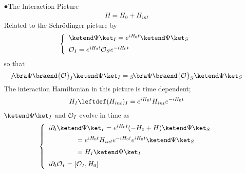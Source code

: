 \bigskip

\noindent
●The Interaction Picture
\begin{eqnarray}
H = H_0 + H_{int}
\label{eqn:HamiltonianDecomposed}
\end{eqnarray}
Related to the Schr\"odinger picture by
\begin{eqnarray}
\left\{
\begin{array}{l}
\ketend \Psi \ket_I
=
e^{iH_0 t}
\ketend \Psi \ket_S
\vspace{2mm}
\\
{\cal O}_I = 
e^{iH_0 t} {\cal O}_S e^{-iH_0 t}
\end{array}
\right.
\end{eqnarray}
so that
\begin{equation}
{}_I\!\bra \Psi \braend {\cal O}_I \ketend \Psi \ket_I
=
{}_S\!\bra \Psi \braend {\cal O}_S \ketend \Psi \ket_S
\end{equation}
The interaction Hamiltonian in this picture is time dependent;
\begin{eqnarray}
H_I \leftdef (H_{int})_I = 
e^{iH_0 t} H_{int} e^{-iH_0 t}
\label{eqn:defHintI}
\end{eqnarray}
$\ketend \Psi \ket_I$ and ${\cal O}_I$ 
evolve in time as
\begin{eqnarray}
\left\{
\begin{array}{l}
i \partial_t 
\ketend \Psi \ket_I
=
e^{i H_0 t} (-H_0 + H) \ketend \Psi \ket_S
\vspace{2mm}
\\
\hspace{15mm}
=
e^{i H_0 t} H_{int} e^{-i H_0 t}e^{i H_0 t} \ketend \Psi \ket_S
\vspace{2mm}
\\
\hspace{15mm}
=
H_I \ketend \Psi \ket_I
\vspace{2mm}
\\
i \partial_t 
{\cal O}_I = 
[ {\cal O}_I, H_0]
\end{array}
\right.
\label{eqn:InteractionPicTime}
\end{eqnarray}

